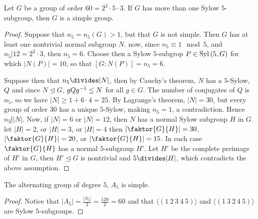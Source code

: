 \begin{theorem}\label{theorem_4.6.1}
  Let $G$ be a group of order $60=2^2 \cdot 5 \cdot 3$. If $G$ has more than
  one Sylow $5$-subgroup, then $G$ is a simple group.
\end{theorem}
\begin{proof}
  Suppose that $n_5=n_5(G)>1$, but that $G$ is not simple. Then $G$ has at
  least one nontrivial normal subgroup $N$. now, since  $n_5 \equiv 1
  \mod{5}$, and $n_5|12=2^2 \cdot 3$, then $n_5=6$. Choose then a Sylow
  $5$-subgrop $P \in \operatorname{Syl}{(5,G)}$ for which $|N(P)|=10$, so that
  $[G:N(P)]=n_5=6$.

  Suppose then that $n_5 \divides |N|$, then by Cauchy's theorem, $N$ has a
  $5$-Sylow, $Q$ and since $N \unlhd G$, $gQg^{-1} \leq N$ for all $g \in G$.
  The number of conjugates of $Q$ is $n_5$, so we have $|N| \geq 1+6 \cdot
  4=25$. By Lagrange's theorem, $|N|=30$, but every group of order $30$
  has a unique  $5$-Sylow, making  $n_5=1$, a contradiction. Hence $n_5 \not|
  |N|$. Now, if $|N|=6$ or $|N|=12$, then $N$ has a normal Sylow
  subgroup $H$ in $G$. let $|H|=2$, or $|H|=3$, or $|H|=4$ then
  $|\faktor{G}{H}|=30$, $|\faktor{G}{H}|=20$, or
  $|\faktor{G}{H}|=15$. In each case $\faktor{G}{H}$ has a normal
  $5$-subgroup  $H'$. Let  $H'$ be the complete preimage of  $H'$ in  $G$,
  then  $H' \unlhd G$ is nontrivial and  $5 \divides |H|$, which contradicts
  the above assumption.
\end{proof}
\begin{corollary}
  The alternating group of degree $5$,  $A_5$ is simple.
\end{corollary}
\begin{proof}
  Notice that $|A_5|=\frac{|S_5|}{2}=\frac{120}{2}=60$ and that
  $\langle (1 \ 2 \ 3 \ 4 \ 5) \rangle$ and $\langle (1 \ 3 \ 2 \ 4 \ 5)
  \rangle$ are Sylow $5$-subgroups.
\end{proof}


